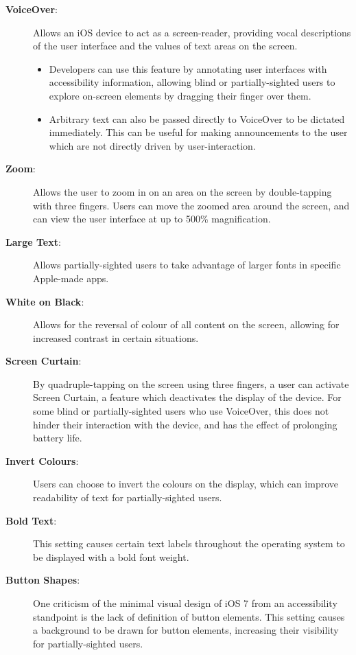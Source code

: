 \documentclass[10pt,twocolumn]{article}
\begin{document}
\begin{description}
\item[\textbf{VoiceOver}:] Allows an iOS device to act as a screen-reader, providing vocal descriptions of the user interface and the values of text areas on the screen. 
\begin{itemize}
\item Developers can use this feature by annotating user interfaces with accessibility information, allowing blind or partially-sighted users to explore on-screen elements by dragging their finger over them. 
\item Arbitrary text can also be passed directly to VoiceOver to be dictated immediately. This can be useful for making announcements to the user which are not directly driven by user-interaction.
\end{itemize}
\item[\textbf{Zoom}: ] Allows the user to zoom in on an area on the screen by double-tapping with three fingers. Users can move the zoomed area around the screen, and can view the user interface at up to 500\% magnification.
\item[\textbf{Large Text}:]  Allows partially-sighted users to take advantage of larger fonts in specific Apple-made apps.
\item[\textbf{White on Black}:] Allows for the reversal of colour of all content on the screen, allowing for increased contrast in certain situations.
\item[\textbf{Screen Curtain}:]  By quadruple-tapping on the screen using three fingers, a user can activate Screen Curtain, a feature which deactivates the display of the device. For some blind or partially-sighted users who use VoiceOver, this does not hinder their interaction with the device, and has the effect of prolonging battery life.
\item[\textbf{Invert Colours}:]   Users can choose to invert the colours on the display, which can improve readability of text for partially-sighted users.
\item[\textbf{Bold Text}:]  This setting causes certain text labels throughout the operating system to be displayed with a bold font weight.
\item[\textbf{Button Shapes}:] One criticism of the minimal visual design of iOS 7 from an accessibility standpoint is the lack of definition of button elements. This setting causes a background to be drawn for button elements, increasing their visibility for partially-sighted users.
\end{description}
\end{document}
